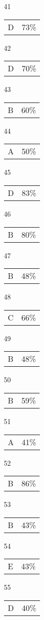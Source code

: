 \documentclass[12pt]{article}
\begin{document}
\begin{multicols}{5}
\begin{enumerate}
\item[41] \begin{tabular}{cc} D& 73\%\end{tabular}
\item[42] \begin{tabular}{cc} D & 70\%\end{tabular}
\item[43] \begin{tabular}{cc} B & 60\%\end{tabular}
\item[44] \begin{tabular}{cc} A & 50\%\end{tabular}
\item[45] \begin{tabular}{cc} D & 83\%\end{tabular}
\item[]
\item[46] \begin{tabular}{cc} B & 80\%\end{tabular}
\item[47] \begin{tabular}{cc} B & 48\%\end{tabular}
\item[48] \begin{tabular}{cc} C & 66\%\end{tabular}
\item[49] \begin{tabular}{cc} B & 48\%\end{tabular}
\item[50] \begin{tabular}{cc} B & 59\%\end{tabular}
\item[]
\item[51] \begin{tabular}{cc} A & 41\%\end{tabular}
\item[52] \begin{tabular}{cc} B & 86\%\end{tabular}
\item[53] \begin{tabular}{cc} B & 43\%\end{tabular}
\item[54] \begin{tabular}{cc} E & 43\%\end{tabular}
\item[55] \begin{tabular}{cc} D & 40\%\end{tabular}

\end{enumerate}
\end{multicols}
\end{document}
